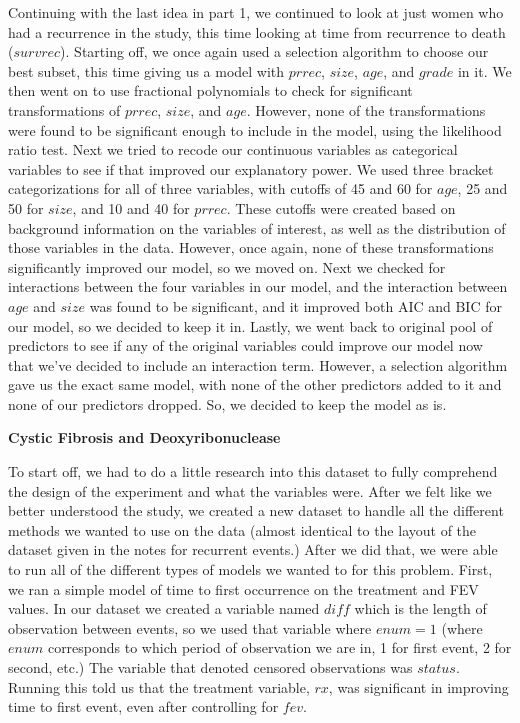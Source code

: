 \documentclass[11pt,letterpaper]{article}
\begin{document}
Continuing with the last idea in part 1, we continued to look at just women who had a recurrence in the study, this time looking at time from recurrence to death ($survrec$). Starting off, we once again used a selection algorithm to choose our best subset, this time giving us a model with $prrec$, $size$, $age$, and $grade$ in it. We then went on to use fractional polynomials to check for significant transformations of $prrec$, $size$, and $age$. However, none of the transformations were found to be significant enough to include in the model, using the likelihood ratio test. Next we tried to recode our continuous variables as categorical variables to see if that improved our explanatory power. We used three bracket categorizations for all of three variables, with cutoffs of 45 and 60 for $age$, 25 and 50 for $size$, and 10 and 40 for $prrec$. These cutoffs were created based on background information on the variables of interest, as well as the distribution of those variables in the data. However, once again, none of these transformations significantly improved our model, so we moved on. Next we checked for interactions between the four variables in our model, and the interaction between $age$ and $size$ was found to be significant, and it improved both AIC and BIC for our model, so we decided to keep it in. Lastly, we went back to original pool of predictors to see if any of the original variables could improve our model now that we've decided to include an interaction term. However, a selection algorithm gave us the exact same model, with none of the other predictors added to it and none of our predictors dropped. So, we decided to keep the model as is.

\begin{center}
\textbf{Cystic Fibrosis and Deoxyribonuclease}\\
\end{center}

\par

To start off, we had to do a little research into this dataset to fully comprehend the design of the experiment and what the variables were. After we felt like we better understood the study, we created a new dataset to handle all the different methods we wanted to use on the data (almost identical to the layout of the dataset given in the notes for recurrent events.) After we did that, we were able to run all of the different types of models we wanted to for this problem. First, we ran a simple model of time to first occurrence on the treatment and FEV values. In our dataset we created a variable named $diff$ which is the length of observation between events, so we used that variable where $enum=1$ (where $enum$ corresponds to which period of observation we are in, 1 for first event, 2 for second, etc.) The variable that denoted censored observations was $status$. Running this told us that the treatment variable, $rx$, was significant in improving time to first event, even after controlling for $fev$.
\end{document}
